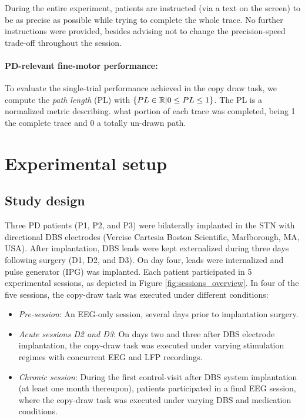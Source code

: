 \documentclass[10pt,a4paper]{article}
\begin{document}
During the entire experiment, patients are instructed (via a text on the screen) to be as precise as possible while trying to complete the whole trace. No further instructions were provided, besides advising not to change the precision-speed trade-off throughout the session.

\paragraph{PD-relevant fine-motor performance:} To evaluate the single-trial performance achieved in the copy draw task, we compute the \textit{path length} (PL) with  $ \left\lbrace PL \in \mathbb{R} | 0 \leq PL \leq 1 \right\rbrace$. The PL is a normalized metric describing. what portion of each trace was completed, being 1 the complete trace and 0 a totally un-drawn path.

\section{Experimental setup}

\subsection{Study design}
Three PD patients (P1, P2, and P3) were bilaterally implanted in the STN with directional DBS electrodes (Vercise Cartesia \texttrademark Boston Scientific, Marlborough, MA, USA). After implantation, DBS leads were kept externalized during three days following surgery (D1, D2, and D3). On day four, leads were internalized and pulse generator (IPG) was implanted. Each patient participated in 5 experimental sessions, as depicted in Figure \ref{fig:sessions_overview}. In four of the five sessions, the copy-draw task was executed under different conditions:
\begin{itemize}
\item \textit{Pre-session}: An EEG-only session, several days prior to implantation surgery.
\item \textit{Acute sessions D2 and D3}: On days two and three after DBS electrode implantation, the copy-draw task was executed under varying stimulation regimes with concurrent EEG and LFP recordings.
\item \textit{Chronic session}: During the first control-visit after DBS system implantation (at least one month thereupon), patients participated in a final EEG session, where the copy-draw task was executed under varying DBS and medication conditions.
\end{itemize}
\end{document}
